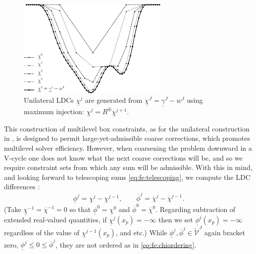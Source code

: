 \documentclass[letterpaper,final,12pt,reqno]{amsart}
\theoremstyle{cstyle}
\theoremstyle{cstyle*}
\theoremstyle{dstyle}
\numberwithin{equation}{section}
\numberwithin{figure}{section}
\numberwithin{table}{section}
\numberwithin{theorem}{section}
\newcommand{\maxR}{R^{\bm{\oplus}}}
\begin{document}
\begin{figure}[ht]
\includegraphics[width=0.65\textwidth]{fixfigs/chiphilevels.pdf}
\caption{Unilateral LDCs $\underline{\chi}^j$ are generated from $\underline{\chi}^J = \underline{\gamma}^J - w^J$ using maximum injection: $\underline{\chi}^j = \maxR \underline{\chi}^{j+1}$.}
\label{fig:chiphilevels}
\end{figure}

This construction of multilevel box constraints, as for the unilateral construction in \cite{GraeserKornhuber2009}, is designed to permit large-yet-admissible coarse corrections, which promotes multilevel solver efficiency.  However, when coarsening the problem downward in a V-cycle one does not know what the next coarse corrections will be, and so we require constraint sets from which any sum will be admissible.  With this in mind, and looking forward to telescoping sums \eqref{eq:fe:telescoping}, we compute the LDC differences \cite{GraeserKornhuber2009}:
\begin{equation}
\underline{\phi}^j = \underline{\chi}^j - \underline{\chi}^{j-1}, \qquad \overline{\phi}^j = \overline{\chi}^j - \overline{\chi}^{j-1}.  \label{eq:fe:philevels}
\end{equation}
(Take $\underline{\chi}^{-1}=\overline{\chi}^{-1}=0$ so that $\underline{\phi}^0=\underline{\chi}^0$ and $\overline{\phi}^0=\overline{\chi}^0$.  Regarding subtraction of extended real-valued quantities, if $\underline{\chi}^j(x_p)=-\infty$ then we set $\underline{\phi}^j(x_p)=-\infty$ regardless of the value of $\underline{\chi}^{j-1}(x_p)$, and etc.)  While $\underline{\phi}^{j},\overline{\phi}^{j} \in \tilde{\mathcal{V}}^J$ again bracket zero, $\underline{\phi}^j \le 0 \le \overline{\phi}^j$, they are not ordered as in \eqref{eq:fe:chiordering}.
\end{document}
